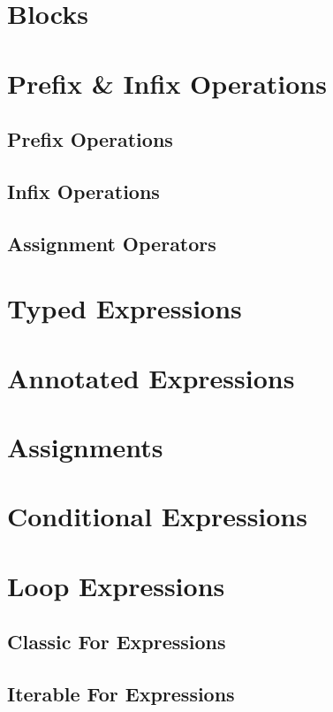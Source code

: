 \section{Blocks}

\section{Prefix \& Infix Operations}

\subsection{Prefix Operations}

\subsection{Infix Operations}

\subsection{Assignment Operators}

\section{Typed Expressions}

\section{Annotated Expressions}

\section{Assignments}

\section{Conditional Expressions}

\section{Loop Expressions}

\subsection{Classic For Expressions}

\subsection{Iterable For Expressions}

